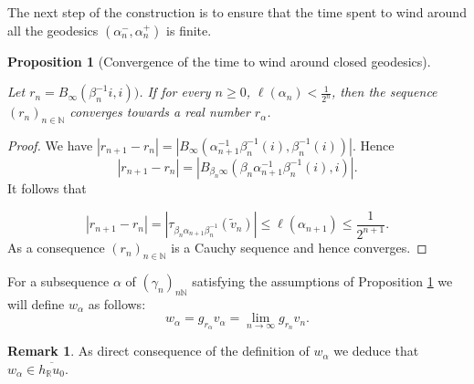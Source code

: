 \documentclass[a4paper,english,reqno]{amsart}
\newcommand{\R}{\mathbb{R}}
\newcommand{\N}{\mathbb{N}} %
\newtheorem{proposition}{Proposition}
\theoremstyle{definition}
\newtheorem{remark}{Remark}
\numberwithin{equation}{section}
\begin{document}
The next step of the construction is to ensure that the time spent to wind around all the geodesics $(\alpha_n^-,\alpha_n^+)$ is finite.

\begin{proposition}[Convergence of the time to wind around closed geodesics]\label{lema_4}
	
Let $r_n=B_\infty(\beta_n^{-1}i,i))$. If for every $n\geq 0$,  $\ell(\alpha_n)<\frac{1}{2^n}$, then the sequence $(r_n)_{n\in\N}$ converges towards a real number $r_\alpha$.    
\end{proposition}

\begin{proof}
We have $\left | r_{n+1}-r_n  \right |=\left | B_\infty(\alpha_{n+1}^{-1}\beta_n^{-1}(i), \beta_n^{-1}(i)) \right |$.
Hence
 $$\left | r_{n+1}-r_n  \right |=\left | B_{\beta_n \infty}(\beta_n\alpha_{n+1}^{-1}\beta_n^{-1}(i),i) \right |.$$
 It follows that

$$
\left | r_{n+1}-r_n  \right |=\left | \tau_{\beta_n\alpha_{n+1}\beta_n^{-1}}(\tilde v_n) \right|\leq \ell(\alpha_{n+1})\leq \frac{1}{2^{n+1}}.$$
As a consequence $(r_n)_{n\in \N}$ is a Cauchy sequence and hence converges.
\end{proof}

For a subsequence $\alpha$ of $(\gamma_n)_{n\N}$ satisfying the assumptions of Proposition \ref{lema_4} we will define $w_\alpha$ as follows:
$$w_\alpha=g_{r_\alpha}v_\alpha=\lim\limits_{n\to \infty}g_{r_n}v_n.$$

\begin{remark}\label{obs_orbit}
As direct consequence of the definition of $w_\alpha$ we deduce that $w_\alpha\in \overline{h_\R u_0}$.
\end{remark}
\end{document}
